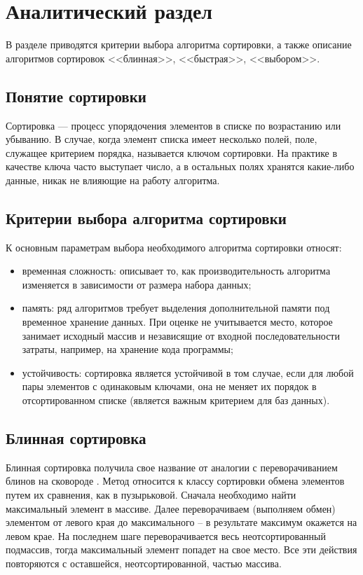 \chapter{Аналитический раздел}
В разделе приводятся критерии выбора алгоритма сортировки, а также описание алгоритмов сортировок <<блинная>>, <<быстрая>>, <<выбором>>.
\section{Понятие сортировки}
Сортировка — процесс упорядочения элементов в списке по возрастанию или убыванию. В случае, когда элемент списка имеет несколько полей, поле, служащее критерием порядка, называется ключом сортировки. На практике в качестве ключа часто выступает число, а в остальных полях хранятся какие-либо данные, никак не влияющие на работу алгоритма.

\section{Критерии выбора алгоритма сортировки}
К основным параметрам выбора необходимого алгоритма сортировки относят:
\begin{itemize}
	\item временная сложность: описывает то, как производительность алгоритма изменяется в зависимости от размера набора данных;
	\item память: ряд алгоритмов требует выделения дополнительной памяти под временное хранение данных. При оценке не учитывается место, которое занимает исходный массив и независящие от входной последовательности затраты, например, на хранение кода программы;
	\item устойчивость: сортировка является устойчивой в том случае, если для любой пары элементов с одинаковым ключами, она не меняет их порядок в отсортированном списке (является важным критерием для баз данных).
\end{itemize} 

\section{Блинная сортировка}
Блинная сортировка получила свое название от аналогии с переворачиванием блинов на сковороде \cite{sort_pancake}. Метод относится к классу сортировки обмена элементов путем их сравнения, как в пузырьковой. Сначала необходимо найти максимальный элемент в массиве. Далее переворачиваем (выполняем обмен) элементом от левого края до максимального -- в результате максимум окажется на левом крае. На последнем шаге переворачивается весь неотсортированный подмассив, тогда максимальный элемент попадет на свое место. Все эти действия повторяются с оставшейся, неотсортированной, частью массива. 

